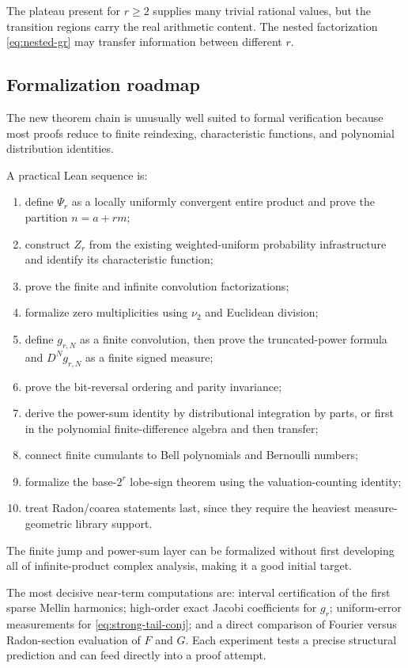 \documentclass[11pt,oneside]{article}
\numberwithin{equation}{section}
\theoremstyle{definition}
\theoremstyle{remark}
\begin{document}
The plateau present for $r\ge2$ supplies many trivial rational values, but the
transition regions carry the real arithmetic content.  The nested
factorization \eqref{eq:nested-gr} may transfer information between different
$r$.

\subsection{Formalization roadmap}

The new theorem chain is unusually well suited to formal verification because
most proofs reduce to finite reindexing, characteristic functions, and
polynomial distribution identities.

A practical Lean sequence is:
\begin{enumerate}
\item define $\Psi_r$ as a locally uniformly convergent entire product and
      prove the partition $n=a+rm$;
\item construct $Z_r$ from the existing weighted-uniform probability
      infrastructure and identify its characteristic function;
\item prove the finite and infinite convolution factorizations;
\item formalize zero multiplicities using $\nu_2$ and Euclidean division;
\item define $g_{r,N}$ as a finite convolution, then prove the truncated-power
      formula and $D^Ng_{r,N}$ as a finite signed measure;
\item prove the bit-reversal ordering and parity invariance;
\item derive the power-sum identity by distributional integration by parts,
      or first in the polynomial finite-difference algebra and then transfer;
\item connect finite cumulants to Bell polynomials and Bernoulli numbers;
\item formalize the base-$2^r$ lobe-sign theorem using the valuation-counting
      identity;
\item treat Radon/coarea statements last, since they require the heaviest
      measure-geometric library support.
\end{enumerate}
The finite jump and power-sum layer can be formalized without first developing
all of infinite-product complex analysis, making it a good initial target.

\begin{frontierbox}
The most decisive near-term computations are: interval certification of the
first sparse Mellin harmonics; high-order exact Jacobi coefficients for
$g_r$; uniform-error measurements for \eqref{eq:strong-tail-conj}; and a direct
comparison of Fourier versus Radon-section evaluation of $F$ and $G$.  Each
experiment tests a precise structural prediction and can feed directly into a
proof attempt.
\end{frontierbox}
\end{document}
